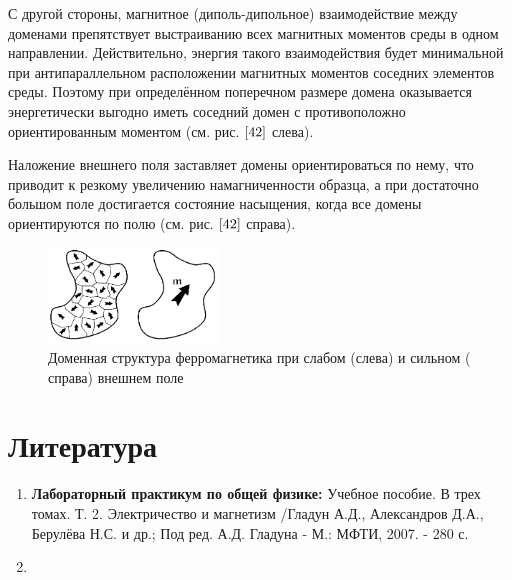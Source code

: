 \documentclass[a4paper,14pt]{article} %
\begin{document}
С другой стороны, магнитное (диполь-дипольное) взаимодействие между доменами препятствует выстраиванию всех магнитных моментов среды в одном направлении. Действительно, энергия такого взаимодействия будет минимальной при  $\textbf{антипараллельном}$ расположении магнитных моментов соседних элементов среды. Поэтому при определённом поперечном размере домена оказывается энергетически выгодно иметь соседний домен с противоположно ориентированным моментом (см. рис. $\ref{42}$ слева).

Наложение внешнего поля заставляет домены ориентироваться по нему, что приводит к резкому увеличению намагниченности образца, а при достаточно большом поле достигается состояние $\textbf{насыщения}$, когда все домены ориентируются по полю (см. рис. $\ref{42}$ справа).

\begin{figure}[h!]

\begin{center}
\includegraphics[width=0.4\textwidth]{4.2.png} 
\end{center}
\caption{Доменная структура ферромагнетика при слабом ($\textbf{слева}$) и сильном ($\textbf{справа}$) внешнем поле}
\label{42}
\end{figure}
\section{Литература}

\begin{enumerate}

\item \textbf{Лабораторный практикум по общей физике:} Учебное пособие. В трех томах. Т. 2. Электричество и магнетизм /Гладун А.Д., Александров Д.А., Берулёва Н.С. и др.; Под ред. А.Д. Гладуна - М.: МФТИ, 2007. - 280 с.

\item {}

\end{enumerate}		
		
\end{document}
